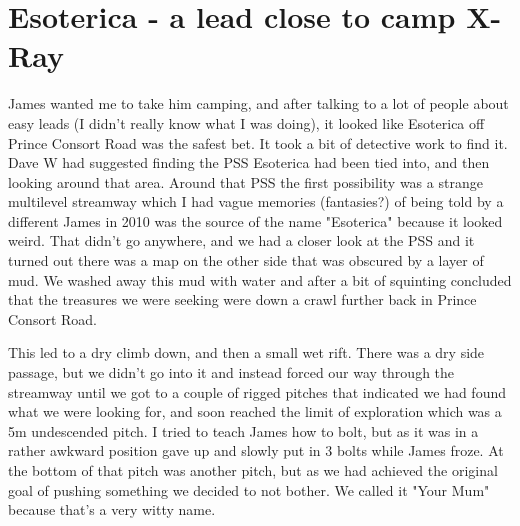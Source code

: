 \section{Esoterica - a lead close to camp X-Ray}
\begin{marginfigure}
\end{marginfigure}

James wanted me to take him camping, and after talking to a lot of people about easy leads (I didn't really know what I was doing), it looked like Esoterica off Prince Consort Road was the safest bet. It took a bit of detective work to find it. Dave W had suggested finding the PSS Esoterica had been tied into, and then looking around that area. Around that PSS the first possibility was a strange multilevel streamway which I had vague memories (fantasies?) of being told by a different James in 2010 was the source of the name "Esoterica" because it looked weird. That didn't go anywhere, and we had a closer look at the PSS and it turned out there was a map on the other side that was obscured by a layer of mud. We washed away this mud with water and after a bit of squinting concluded that the treasures we were seeking were down a crawl further back in Prince Consort Road. 

This led to a dry climb down, and then a small wet rift. There was a dry side passage, but we didn't go into it and instead forced our way through the streamway until we got to a couple of rigged pitches that indicated we had found what we were looking for, and soon reached the limit of exploration which was a 5m undescended pitch. I tried to teach James how to bolt, but as it was in a rather awkward position gave up and slowly put in 3 bolts while James froze. At the bottom of that pitch was another pitch, but as we had achieved the original goal of pushing something we decided to not bother. We called it "Your Mum" because that's a very witty name. 

